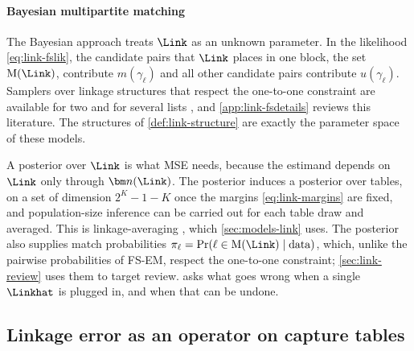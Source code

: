 \paragraph{Bayesian multipartite matching}
The Bayesian approach treats $\Link$ as an unknown parameter. In the likelihood \eqref{eq:link-fslik}, the candidate pairs that $\Link$ places in one block, the set $\mathrm M(\Link)$, contribute $m(\gamma_\ell)$ and all other candidate pairs contribute $u(\gamma_\ell)$. Samplers over linkage structures that respect the one-to-one constraint are available for two and for several lists \citep{sadinle2013,steorts2016,sadinle2017}, and \cref{app:link-fsdetails} reviews this literature. The structures of \cref{def:link-structure} are exactly the parameter space of these models.

A posterior over $\Link$ is what MSE needs, because the estimand depends on $\Link$ only through $\bm n(\Link)$. The posterior induces a posterior over tables, on a set of dimension $2^K-1-K$ once the margins \eqref{eq:link-margins} are fixed, and population-size inference can be carried out for each table draw and averaged. This is linkage-averaging \citep{sadinle2018}, which \cref{sec:models-link} uses. The posterior also supplies match probabilities $\pi_\ell=\Pr(\ell\in\mathrm M(\Link)\mid\text{data})$, which, unlike the pairwise probabilities of FS-EM, respect the one-to-one constraint; \cref{sec:link-review} uses them to target review.  asks what goes wrong when a single $\Linkhat$ is plugged in, and when that can be undone.

\subsection{Linkage error as an operator on capture tables}\label{sec:link-operator}

